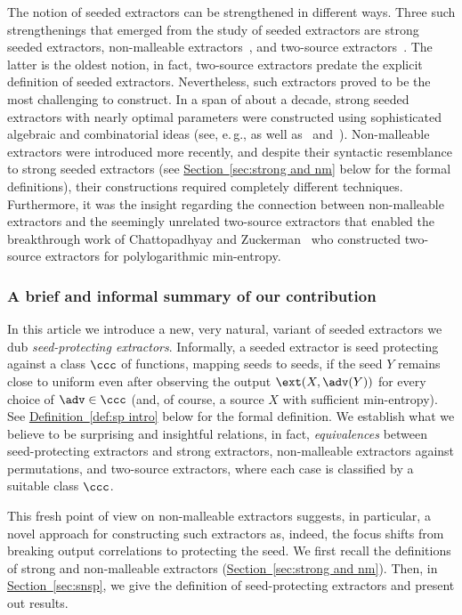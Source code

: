 \documentclass[11pt]{article}
\numberwithin{equation}{section}
\theoremstyle{definition}
\theoremstyle{plain}
\newcommand{\eg}{e.\,g.}
\newcommand{\expref}[2]{\hyperref[#2]{#1~\ref{#2}}}
\begin{document}
The notion of seeded extractors can be strengthened in different ways. Three such strengthenings that emerged from the study of seeded extractors are strong seeded extractors, non-malleable extractors~\cite{DW09}, and two-source extractors~\cite{CG88}. The latter is the oldest notion, in fact, two-source extractors predate the explicit definition of seeded extractors. Nevertheless, such extractors proved to be the most challenging to construct. In a span of about a decade, strong seeded extractors with nearly optimal parameters were constructed using sophisticated algebraic and combinatorial ideas (see, \eg, \cite{Trevisan01,LRVW03,GUV09,DKSS13,TSU12} as well as~\cite{Shaltiel11} and~\cite[Chapter 6]{Vadhan12}). Non-malleable extractors were introduced more recently, and despite their syntactic resemblance to strong seeded extractors (see \expref{Section}{sec:strong and nm} below for the formal definitions), their constructions required completely different techniques. Furthermore, it was the insight regarding the connection between non-malleable extractors and the seemingly unrelated two-source extractors that enabled the breakthrough
work of Chattopadhyay and Zuckerman~\cite{CZ19} who constructed two-source extractors for
%
polylogarithmic  %
min-entropy. 
%
%
\subsubsection*{A brief and informal summary of our contribution}
%

In this %
article  %
we introduce a new, very natural, variant of seeded extractors we dub \emph{seed-protecting extractors}. Informally, a seeded extractor is seed protecting 
against a class %
$\ccc$ of functions,
mapping seeds to seeds, if the seed $Y$ remains close to uniform even after observing the output $\ext(X,\adv(Y))$ for every choice of $\adv \in \ccc$ (and, of course, a source $X$ with sufficient min-entropy). See \expref{Definition}{def:sp intro} below for the formal definition. We establish what we believe to be surprising and insightful relations, in fact, \emph{equivalences} between seed-protecting extractors and strong extractors, non-malleable extractors against permutations, and two-source extractors, where each case is classified by a suitable class $\ccc$. 
 
 This fresh point of view on non-malleable extractors suggests, in particular, a novel approach for constructing such extractors as, indeed, the focus shifts from breaking output correlations to protecting the seed.  
%
 We first recall the definitions of strong and non-malleable extractors (\expref{Section}{sec:strong and nm}). Then, in \expref{Section}{sec:snsp}, we give the definition of seed-protecting extractors and present out results.
\end{document}
